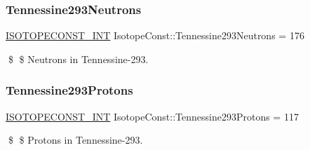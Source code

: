 \subsubsection{\texorpdfstring{Tennessine293\+Neutrons}{Tennessine293Neutrons}}
{\footnotesize\ttfamily \mbox{\hyperlink{group___isotope_const-_macros_ga5f18360b3e99483a35c32d789e62621c}{I\+S\+O\+T\+O\+P\+E\+C\+O\+N\+S\+T\+\_\+\+I\+NT}} Isotope\+Const\+::\+Tennessine293\+Neutrons = 176}

\$ \$ Neutrons in Tennessine-\/293. \mbox{\label{group___isotope_const-_tennessine-_ts293_gae0bac8d37e417353757055672d5da3d3}} 
\subsubsection{\texorpdfstring{Tennessine293\+Protons}{Tennessine293Protons}}
{\footnotesize\ttfamily \mbox{\hyperlink{group___isotope_const-_macros_ga5f18360b3e99483a35c32d789e62621c}{I\+S\+O\+T\+O\+P\+E\+C\+O\+N\+S\+T\+\_\+\+I\+NT}} Isotope\+Const\+::\+Tennessine293\+Protons = 117}

\$ \$ Protons in Tennessine-\/293. 
